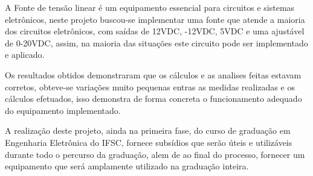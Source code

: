 \documentclass[
	article,			%
	11pt,				%
	oneside,			%
	a4paper,			%
	english,			%
	brazil,				%
	sumario=tradicional
	]{abntex2}
\begin{document}
A Fonte de tensão linear é um equipamento essencial para circuitos e sistemas eletrônicos, neste projeto buscou-se implementar uma fonte que atende a maioria dos circuitos eletrônicos, com saídas de 12VDC, -12VDC, 5VDC e uma ajustável de 0-20VDC, assim, na maioria das situações este circuito pode ser implementado e aplicado.

Os resultados obtidos demonstraram que os cálculos e as analises feitas estavam corretos, obteve-se variações muito pequenas entras as medidas realizadas e os cálculos efetuados, isso demonstra de forma concreta o funcionamento adequado do equipamento implementado.

A realização deste projeto, ainda na primeira fase, do curso de graduação em Engenharia Eletrônica do IFSC, fornece subsídios que serão úteis e utilizáveis durante todo o percurso da graduação, alem de ao final do processo, fornecer um equipamento que será amplamente utilizado na graduação inteira.

\postextual


%

%
%


\end{document}
